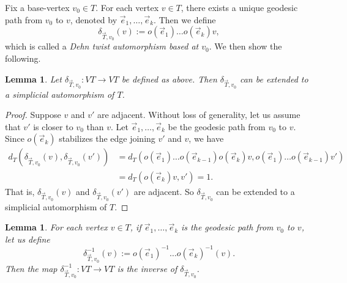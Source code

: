 \documentclass[12pt,a4paper]{amsart}
\numberwithin{equation}{section}
\theoremstyle{plain}
\newtheorem{lemma}[theorem]{Lemma}
\theoremstyle{definition}
\theoremstyle{remark}
\begin{document}
Fix a base-vertex $v_0 \in T$.
For each vertex $v \in T$, there exists a unique geodesic path from $v_0$ to $v$, denoted by $\vec{e}_1, \dots, \vec{e}_k$.
Then we define \[\delta_{\vec{T}, v_0}(v) := o(\vec{e}_1) \dots o(\vec{e}_k)v,\] which is called a \emph{Dehn twist automorphism based at $v_0$}.
We then show the following.

\begin{lemma}
    Let $\delta_{\vec{T}, v_0}: VT \to VT$ be defined as above.
    Then $\delta_{\vec{T}, v_0}$ can be extended to a simplicial automorphism of $T$.
\end{lemma}

\begin{proof}
    Suppose $v$ and $v'$ are adjacent.
    Without loss of generality, let us assume that $v'$ is closer to $v_0$ than $v$.
    Let $\vec{e}_1, \dots, \vec{e}_k$ be the geodesic path from $v_0$ to $v$.
    Since $o(\vec{e}_k)$ stabilizes the edge joining $v'$ and $v$, we have
    \begin{align*}
        d_T(\delta_{\vec{T}, v_0}(v), \delta_{\vec{T}, v_0}(v')) &= d_T(o(\vec{e}_1)\dots o(\vec{e}_{k-1}) o(\vec{e}_{k})v, o(\vec{e}_1)\dots o(\vec{e}_{k-1})v') \\
        &= d_T(o(\vec{e}_k)v,v') = 1.
    \end{align*}
    That is, $\delta_{\vec{T}, v_0}(v)$ and $\delta_{\vec{T}, v_0}(v')$ are adjacent.
    So $\delta_{\vec{T}, v_0}$ can be extended to a simplicial automorphism of $T$.
\end{proof}

\begin{lemma}
    For each vertex $v \in T$, if $\vec{e}_1, \dots, \vec{e}_k$ is the geodesic path from $v_0$ to $v$, let us define \[\delta_{\vec{T}, v_0}^{-1}(v) := o(\vec{e}_1)^{-1} \dots o(\vec{e}_k)^{-1}(v).\]
    Then the map $\delta_{\vec{T}, v_0}^{-1}: VT \to VT$ is the inverse of $\delta_{\vec{T}, v_0}$.
\end{lemma}
\end{document}
